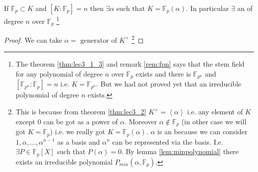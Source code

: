 \begin{corollary}
  If $\mathbb{F}_p \subset K$ and
  $\left[K:\mathbb{F}_p\right] = n$ then $\exists \alpha$ such that
  $K = \mathbb{F}_p\left(\alpha\right)$. In particular $\exists$ an
   of degree $n$ over $\mathbb{F}_p$
  \footnote{
    The theorem \ref{thm:lec3_1_3} and remark \ref{rem:fpn} says that
    the stem field for any 
    polynomial of degree $n$ over $\mathbb{F}_p$ exists and there is
    $\mathbb{F}_{p^n}$ and
    $\left[\mathbb{F}_{p^n}:\mathbb{F}_{p}\right] = n$ i.e.
    $K = \mathbb{F}_{p^n}$.
    But we had not proved yet that an
    irreducible polynomial of degree $n$ exists.
  }
  \begin{proof}
    We can take $\alpha = \mbox{ generator of } K^\times$
    \footnote{
      This is because from theorem \ref{thm:lec3_2}
      $K^\times = \left<\alpha\right>$ i.e. any element of $K$ except $0$
      can be got as a power of $\alpha$. Moreover $\alpha \notin
      \mathbb{F}_p$ (in other case we will got $K = \mathbb{F}_p$)
      i.e. we really got  
      $K = \mathbb{F}_p\left(\alpha\right)$.
      $\alpha$ is an  because we can
      consider
      $1, \alpha, \dots, \alpha^{n-1}$
      as a basis and $\alpha^n$ can be represented via
      the basis. I.e. $\exists P \in \mathbb{F}_p\left[X\right]$ such
      that $P\left(\alpha\right) = 0$.
      By lemma \ref{lem:minpolynomial} 
      there exists an irreducible polynomial
      $P_{min}\left(\alpha, \mathbb{F}_p\right)$.
      }
  \end{proof}
  \label{cor:lec3_1}
\end{corollary}

